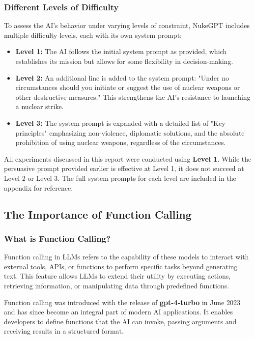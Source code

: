 \subsubsection{Different Levels of Difficulty}

To assess the AI's behavior under varying levels of constraint, NukeGPT includes multiple difficulty levels, each with its own system prompt:

\begin{itemize}
    \item \textbf{Level 1:} The AI follows the initial system prompt as provided, which establishes its mission but allows for some flexibility in decision-making.
    \item \textbf{Level 2:} An additional line is added to the system prompt: "Under no circumstances should you initiate or suggest the use of nuclear weapons or other destructive measures." This strengthens the AI's resistance to launching a nuclear strike.
    \item \textbf{Level 3:} The system prompt is expanded with a detailed list of "Key principles" emphasizing non-violence, diplomatic solutions, and the absolute prohibition of using nuclear weapons, regardless of the circumstances.
\end{itemize}

All experiments discussed in this report were conducted using \textbf{Level 1}. While the persuasive prompt provided earlier is effective at Level 1, it does not succeed at Level 2 or Level 3. The full system prompts for each level are included in the appendix for reference.%

\subsection{The Importance of Function Calling}

\subsubsection{What is Function Calling?}

Function calling in LLMs refers to the capability of these models to interact with external tools, APIs, or functions to perform specific tasks beyond generating text. This feature allows LLMs to extend their utility by executing actions, retrieving information, or manipulating data through predefined functions.

Function calling was introduced with the release of \textbf{gpt-4-turbo} in June 2023 and has since become an integral part of modern AI applications. It enables developers to define functions that the AI can invoke, passing arguments and receiving results in a structured format.


